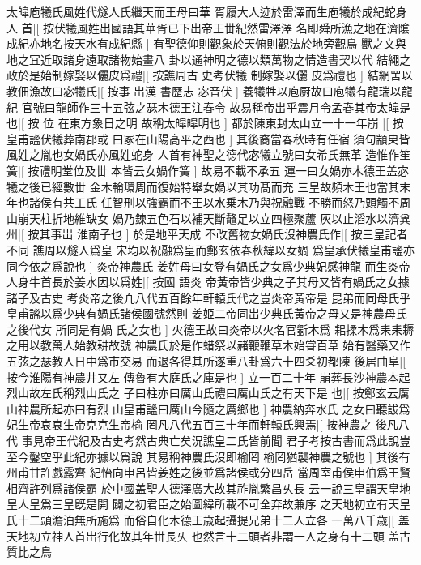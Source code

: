 太皡庖犧氏風姓代燧人氏繼天而王母曰華%
胥履大人迹於雷澤而生庖犧於成紀蛇身人%
首|[%
按伏犧風姓岀國語其華胥已下岀帝王丗紀然雷澤澤%
名即舜所漁之地在濟隂成紀亦地名按天水有成紀縣%
]%
有聖德仰則觀象於天俯則觀法於地旁觀鳥%
獸之文與地之冝近取諸身遠取諸物始畫八%
卦以通神明之德以類萬物之情造書契以代%
結繩之政於是始制嫁娶以儷皮爲禮|[%
按譙周古%
史考伏犧%
%
制嫁娶以儷%
皮爲禮也%
]%
結網罟以教佃漁故曰宓犧氏|[%
按事%
岀漢%
%
書歷志%
宓音伏%
]%
養犧牲以庖厨故曰庖犧有龍瑞以龍紀%
官號曰龍師作三十五弦之瑟木德王注春令%
故易稱帝岀乎震月令孟春其帝太皡是也|[%
按%
位%
%
在東方象日之明%
故稱太皡皡明也%
]%
都於陳東封太山立一十一年崩%
|[%
按皇甫謐伏犧葬南郡或%
曰冢在山陽高平之西也%
]%
其後裔當春秋時有任宿%
須句顓㬰皆風姓之胤也女媧氏亦風姓蛇身%
人首有神聖之德代宓犧立號曰女希氏無革%
造惟作笙簧|[%
按禮明堂位及丗%
本皆云女媧作簧%
]%
故易不載不承五%
運一曰女媧亦木德王盖宓犧之後已經數丗%
金木輪環周而復始特舉女媧以其功髙而充%
三皇故頻木王也當其末年也諸侯有共工氏%
任智刑以強霸而不王以水乗木乃與祝融戰%
不勝而怒乃頭觸不周山崩天柱折地維缺女%
媧乃鍊五色石以補天斷鼇足以立四極聚蘆%
灰以止滔水以濟兾州|[%
按其事岀%
淮南子也%
]%
於是地平天成%
不改舊物女媧氏沒神農氏作|[%
按三皇記者不同%
譙周以燧人爲皇%
%
宋均以祝融爲皇而鄭玄依春秋緯以女媧%
爲皇承伏犧皇甫謐亦同今依之爲說也%
]%
炎帝神農氏%
姜姓母曰女登有媧氏之女爲少典妃感神龍%
而生炎帝人身牛首長於姜水因以爲姓|[%
按國%
語炎%
%
帝黃帝皆少典之子其母又皆有媧氏之女據諸子及古史%
考炎帝之後凢八代五百餘年軒轅氏代之豈炎帝黃帝是%
昆弟而同母氏乎皇甫謐以爲少典有媧氏諸侯國號然則%
姜姬二帝同岀少典氏黃帝之母又是神農母氏之後代女%
所同是有媧%
氏之女也%
]%
火德王故曰炎帝以火名官斵木爲%
耜揉木爲耒耒耨之用以教萬人始教耕故號%
神農氏於是作蜡祭以赭鞭鞭草木始甞百草%
始有醫藥又作五弦之瑟教人日中爲市交易%
而退各得其所遂重八卦爲六十四爻初都陳%
後居曲阜|[%
按今淮陽有神農井又左%
傳魯有大庭氏之庫是也%
]%
立一百二十年%
崩葬長沙神農本起烈山故左氏稱烈山氏之%
子曰柱亦曰厲山氏禮曰厲山氏之有天下是%
也|[%
按鄭玄云厲山神農所起亦曰有烈%
山皇甫謐曰厲山今隨之厲鄉也%
]%
神農納奔水氏%
之女曰聽詙爲妃生帝哀哀生帝克克生帝榆%
罔凡八代五百三十年而軒轅氏興焉|[%
按神農之%
後凡八代%
%
事見帝王代紀及古史考然古典亡矣況譙皇二氏皆前聞%
君子考按古書而爲此說豈至今鑿空乎此紀亦據以爲說%
%
其易稱神農氏沒即榆罔%
榆罔猶襲神農之號也%
]%
其後有州甫甘許戲露齊%
紀怡向申呂皆姜姓之後並爲諸侯或分四岳%
當周室甫侯申伯爲王賢相齊許列爲諸侯霸%
於中國盖聖人德澤廣大故其祚胤繁昌乆長%
云一說三皇謂天皇地皇人皇爲三皇旣是開%
闢之初君臣之始圖緯所載不可全弃故兼序%
之天地初立有天皇氏十二頭澹泊無所施爲%
而俗自化木德王歳起攝提兄弟十二人立各%
一萬八千歳|[%
盖天地初立神人首岀行化故其年丗長乆%
也然言十二頭者非謂一人之身有十二頭%
%
盖古質比之鳥%
